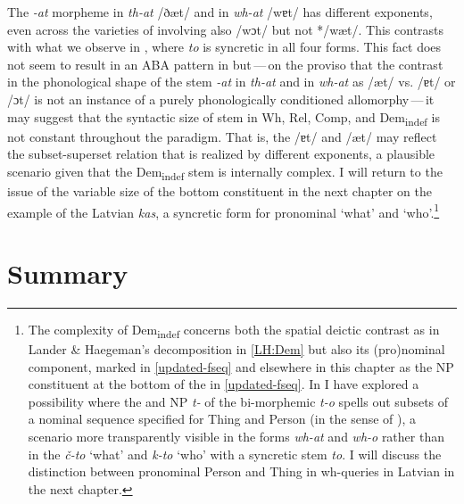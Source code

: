 \noindent The \textit{-at} morpheme in \textit{th-at} /ðæt/ and in \textit{wh-at} /wɐt/ has different exponents, even across the varieties of  involving also /wɔt/ but not */wæt/. This contrasts with what we observe in , where \textit{to} is syncretic in all four forms. This fact does not seem to result in an ABA pattern  in  but\,---\,on the proviso that the contrast in the phonological shape of the stem \textit{-at} in \textit{th-at} and in \textit{wh-at} as /æt/ vs. /ɐt/ or /ɔt/ is not an instance of a purely phonologically conditioned  allomorphy\,---\,it may suggest that the syntactic size of stem in Wh, Rel, Comp, and Dem\textsubscript{indef} is not constant throughout the  paradigm. That is, the  /ɐt/ and /æt/ may reflect the subset-superset relation that is realized by different exponents, a plausible scenario given that the Dem\textsubscript{indef} stem is internally complex. I will return to the issue of the variable size of the bottom constituent in the next chapter on the example of the Latvian \textit{kas}, a syncretic form for pronominal `what' and `who'.\footnote{\label{FN:differentbottoms}The complexity of Dem\textsubscript{indef} concerns both the spatial deictic contrast as in Lander \& Haegeman's \citeyearpar{Lander-Haegeman2016} decomposition in \ref{LH:Dem} but also its (pro)nominal component, marked in \ref{updated-fseq} and elsewhere in this chapter as the NP constituent at the bottom of the  in \ref{updated-fseq}. In \cite{Wiland-PSiCL} I have explored a possibility where the  and  NP \textit{t-} of the bi-morphemic \textit{t-o} spells out subsets of a nominal sequence specified for Thing and Person (in the sense of \citeauthor{Cysouw2004} \citeyear{Cysouw2004,Cysouw2005}), a scenario more transparently visible in the  forms \textit{wh-at} and \textit{wh-o} rather than in the  \textit{\v{c}-to} `what' and \textit{k-to} `who' with a syncretic stem \textit{to}. I will discuss the distinction between pronominal Person and Thing in wh-queries in Latvian in the next chapter.
} %



\section{Summary}

